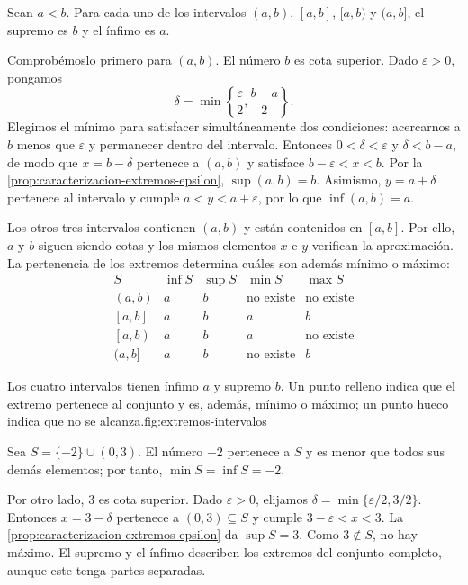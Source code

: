 \begin{example}
\label{ej:extremos-intervalos}
Sean $a<b$. Para cada uno de los intervalos $(a,b)$, $[a,b]$, $[a,b)$ y $(a,b]$, el supremo es $b$ y el ínfimo es $a$.

Comprobémoslo primero para $(a,b)$. El número $b$ es cota superior. Dado $\varepsilon>0$, pongamos
\[
 \delta=\min\left\{\frac{\varepsilon}{2},\frac{b-a}{2}\right\}.
\]
Elegimos el mínimo para satisfacer simultáneamente dos condiciones: acercarnos a $b$ menos que $\varepsilon$ y permanecer dentro del intervalo. Entonces $0<\delta<\varepsilon$ y $\delta<b-a$, de modo que $x=b-\delta$ pertenece a $(a,b)$ y satisface $b-\varepsilon<x<b$. Por la \cref{prop:caracterizacion-extremos-epsilon}, $\sup(a,b)=b$. Asimismo, $y=a+\delta$ pertenece al intervalo y cumple $a<y<a+\varepsilon$, por lo que $\inf(a,b)=a$.

Los otros tres intervalos contienen $(a,b)$ y están contenidos en $[a,b]$. Por ello, $a$ y $b$ siguen siendo cotas y los mismos elementos $x$ e $y$ verifican la aproximación. La pertenencia de los extremos determina cuáles son además mínimo o máximo:
\[
\begin{array}{c|c|c|c|c}
 S & \inf S & \sup S & \min S & \max S\\ \hline
 (a,b) & a & b & \text{no existe} & \text{no existe}\\
 \left[a,b\right] & a & b & a & b\\
 \left[a,b\right) & a & b & a & \text{no existe}\\
 (a,b] & a & b & \text{no existe} & b
\end{array}
\]
\end{example}

\begin{figuranotas}{Los cuatro intervalos tienen ínfimo $a$ y supremo $b$. Un punto relleno indica que el extremo pertenece al conjunto y es, además, mínimo o máximo; un punto hueco indica que no se alcanza.}{fig:extremos-intervalos}

\end{figuranotas}

\begin{example}
Sea $S=\{-2\}\cup(0,3)$. El número $-2$ pertenece a $S$ y es menor que todos sus demás elementos; por tanto, $\min S=\inf S=-2$.

Por otro lado, $3$ es cota superior. Dado $\varepsilon>0$, elijamos $\delta=\min\{\varepsilon/2,3/2\}$. Entonces $x=3-\delta$ pertenece a $(0,3)\subseteq S$ y cumple $3-\varepsilon<x<3$. La \cref{prop:caracterizacion-extremos-epsilon} da $\sup S=3$. Como $3\notin S$, no hay máximo. El supremo y el ínfimo describen los extremos del conjunto completo, aunque este tenga partes separadas.
\end{example}

